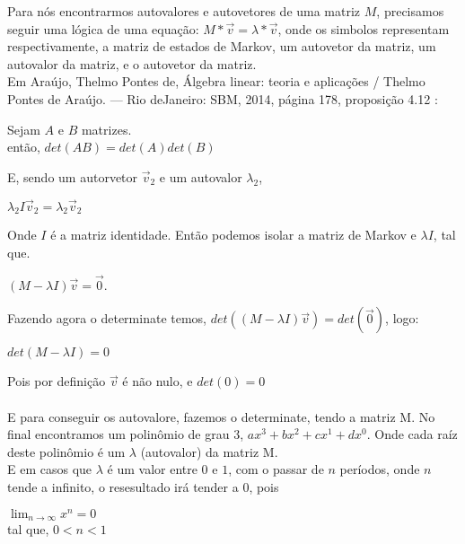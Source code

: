 \documentclass[a4paper,12pt]{article}
\begin{document}
    Para nós encontrarmos autovalores e autovetores de uma matriz $M$, precisamos seguir uma lógica de uma equação:
$M * \vec{v} = \lambda * \vec{v}$,
onde os simbolos representam respectivamente, a matriz de estados de Markov, um autovetor da matriz, um autovalor da matriz, e o autovetor da matriz. \\

    Em Araújo, Thelmo Pontes de, Álgebra linear: teoria e aplicações / Thelmo Pontes de Araújo. — Rio deJaneiro: SBM, 2014, página 178, proposição 4.12 : \\

\begin{center}
    Sejam $A$ e $B$ matrizes.\\então, $det(AB) = det(A) det(B)$
\end{center}

    E, sendo um autorvetor $\vec{v}_2$ e um autovalor $\lambda_2$,
\begin{center}
$\lambda_2 I \vec{v}_2 = \lambda_2 \vec{v}_2$
\end{center}

    Onde $I$ é a matriz identidade.
Então podemos isolar a matriz de Markov e $\lambda I$, tal que.

\begin{center}
$(M-\lambda I)\vec{v} = \vec{0}$.\end{center}

Fazendo agora o determinate temos, 
$det((M-\lambda I)\vec{v}) = det(\vec{0})$, logo:

\begin{center}
    $det(M - \lambda I) = 0$
\end{center}

Pois por definição $\vec{v}$ é não nulo, e $det(0) = 0$\\\\
E para conseguir os autovalore, fazemos o determinate, tendo a matriz M. No final encontramos um polinômio de grau 3,  $ax^3 + bx^2 + cx^1 + dx^0$. Onde cada raíz deste polinômio é um $\lambda$ (autovalor) da matriz M.\\

E em casos que $\lambda$ é um valor entre $0$ e $1$, com o passar de $n$ períodos, onde $n$ tende a infinito, o resesultado irá tender a $0$, pois\\
\begin{center}
$\lim_{n\to\infty} x^n = 0$\\ tal que,  $0 < n < 1$\end{center}
\end{document}
